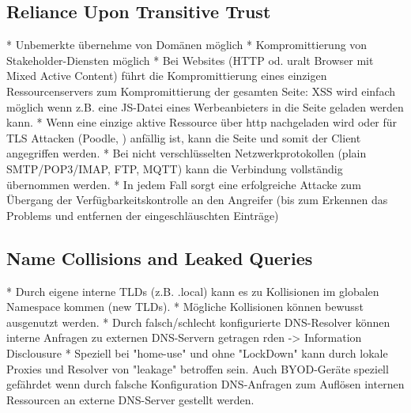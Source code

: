 \subsection{Reliance Upon Transitive Trust}


\begin{draft}
\begin{markdown}
* Unbemerkte übernehme von Domänen möglich
* Kompromittierung von Stakeholder-Diensten möglich
  * Bei Websites  (HTTP od. uralt Browser mit Mixed Active Content) führt die Kompromittierung eines einzigen Ressourcenservers zum Kompromittierung der gesamten Seite: XSS wird einfach möglich wenn z.B. eine JS-Datei eines Werbeanbieters in die Seite geladen werden kann.
  * Wenn eine einzige aktive Ressource über http nachgeladen wird oder für TLS Attacken (Poodle, ) anfällig ist, kann die Seite und somit der Client angegriffen werden.
* Bei nicht verschlüsselten Netzwerkprotokollen (plain SMTP/POP3/IMAP, FTP, MQTT) kann die Verbindung vollständig übernommen werden.
* In jedem Fall sorgt eine erfolgreiche Attacke zum Übergang der Verfügbarkeitskontrolle an den Angreifer (bis zum Erkennen das Problems und entfernen der eingeschläuschten Einträge)
\end{markdown}
\end{draft}

\subsection{Name Collisions and Leaked Queries} 


\begin{draft}
  \begin{markdown}
* Durch eigene interne TLDs (z.B. .local) kann es zu Kollisionen im globalen Namespace kommen (new TLDs).
* Mögliche Kollisionen können bewusst ausgenutzt werden.
* Durch falsch/schlecht konfigurierte DNS-Resolver können interne Anfragen zu externen DNS-Servern getragen rden -> Information Disclousure
* Speziell bei "home-use" und ohne "LockDown" kann durch lokale Proxies und Resolver von "leakage" betroffen sein. Auch BYOD-Geräte speziell gefährdet wenn durch falsche Konfiguration DNS-Anfragen zum Auflösen internen Ressourcen an externe DNS-Server gestellt werden.
\end{markdown}
\end{draft}


